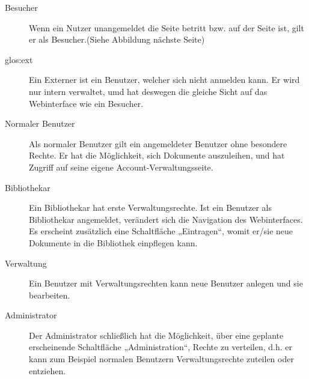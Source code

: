 \begin{description}
\item[Besucher] Wenn ein Nutzer unangemeldet die Seite betritt bzw. auf der Seite ist, gilt er als Besucher.(Siehe Abbildung nächste Seite)
\item [\Gls{glos:ext}] Ein Externer ist ein Benutzer, welcher sich nicht anmelden kann. Er wird nur intern verwaltet, umd hat deswegen die gleiche Sicht
auf das Webinterface wie ein Besucher.
\item [Normaler Benutzer] Als normaler Benutzer gilt ein angemeldeter Benutzer ohne besondere Rechte. Er hat die Möglichkeit, sich Dokumente auszuleihen, und hat Zugriff auf seine eigene Account-Verwaltungsseite.
\item [Bibliothekar] Ein Bibliothekar hat erste Verwaltungsrechte. Ist ein Benutzer als Bibliothekar angemeldet, verändert sich die Navigation des Webinterfaces. Es erscheint zusätzlich eine Schaltfläche „Eintragen“, womit er/sie neue Dokumente in die Bibliothek einpflegen kann.
\item [Verwaltung] Ein Benutzer mit Verwaltungsrechten kann neue Benutzer anlegen und sie bearbeiten.
\item [Administrator] Der Administrator schließlich hat die Möglichkeit, über eine geplante erscheinende Schaltfläche „Administration“, Rechte zu verteilen, d.h. er kann zum Beispiel normalen Benutzern Verwaltungsrechte zuteilen oder entziehen. 
\end{description}











 
